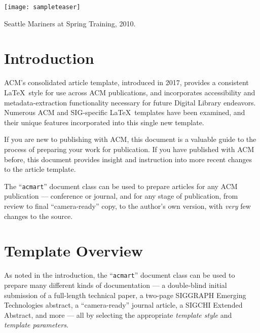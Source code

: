 \documentclass[sigconf]{acmart}
\begin{document}

%

%
\begin{teaserfigure}
  \texttt{[image: sampleteaser]}
  \caption{Seattle Mariners at Spring Training, 2010.}
  \label{fig:teaser}
\end{teaserfigure}

%
\maketitle

\section{Introduction}
ACM's consolidated article template, introduced in 2017, provides a consistent \LaTeX\ style for use across ACM publications, and incorporates accessibility and metadata-extraction functionality necessary for future Digital Library endeavors. Numerous ACM and SIG-specific \LaTeX\ templates have been examined, and their unique features incorporated into this single new template.

If you are new to publishing with ACM, this document is a valuable guide to the process of preparing your work for publication. If you have published with ACM before, this document provides insight and instruction into more recent changes to the article template.

The ``\verb|acmart|'' document class can be used to prepare articles for any ACM publication --- conference or journal, and for any stage of publication, from review to final ``camera-ready'' copy, to the author's own version, with {\it very} few changes to the source. 

\section{Template Overview}
As noted in the introduction, the ``\verb|acmart|'' document class can be used to prepare many different kinds of documentation --- a double-blind initial submission of a full-length technical paper, a two-page SIGGRAPH Emerging Technologies abstract, a ``camera-ready'' journal article, a SIGCHI Extended Abstract, and more --- all by selecting the appropriate {\it template style} and {\it template parameters}.
\end{document}
